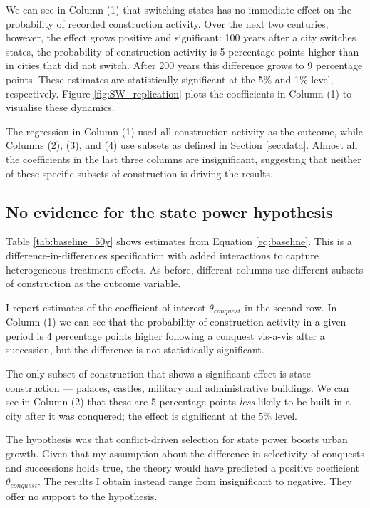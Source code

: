 \documentclass[11pt, a4paper]{article}
\begin{document}
We can see in Column (1) that switching states has no immediate effect on the probability of recorded construction activity. Over the next two centuries, however, the effect grows positive and significant: 100 years after a city switches states, the probability of construction activity is 5 percentage points higher than in cities that did not switch. After 200 years this difference grows to 9 percentage points. These estimates are statistically significant at the 5\% and 1\% level, respectively. Figure \ref{fig:SW_replication} plots the coefficients in Column (1) to visualise these dynamics.

The regression in Column (1) used all construction activity as the outcome, while Columns (2), (3), and (4) use subsets as defined in Section \ref{sec:data}. Almost all the coefficients in the last three columns are insignificant, suggesting that neither of these specific subsets of construction is driving the results. 


\subsection{No evidence for the state power hypothesis}

Table \ref{tab:baseline_50y} shows estimates from Equation \eqref{eq:baseline}. This is a difference-in-differences specification with added interactions to capture heterogeneous treatment effects. As before, different columns use different subsets of construction as the outcome variable. 

I report estimates of the coefficient of interest $\theta_{conquest}$ in the second row. In Column (1) we can see that the probability of construction activity in a given period is 4 percentage points higher following a conquest vis-a-vis after a succession, but the difference is not statistically significant.

The only subset of construction that shows a significant effect is state construction --- palaces, castles, military and administrative buildings. We can see in Column (2) that these are 5 percentage points \textit{less} likely to be built in a city after it was conquered; the effect is significant at the 5\% level. 

The hypothesis was that conflict-driven selection for state power boosts urban growth. Given that my assumption about the difference in selectivity of conquests and successions holds true, the theory would have predicted a positive coefficient $\theta_{conquest}$. The results I obtain instead range from insignificant to negative. They offer no support to the hypothesis.
\end{document}
